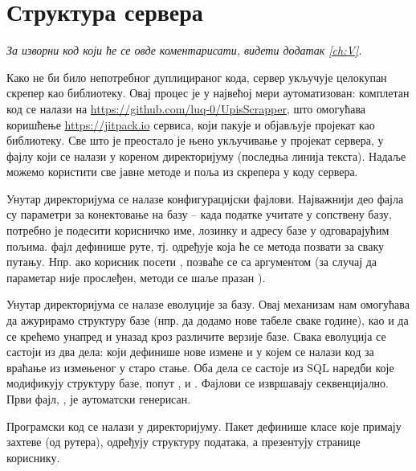 \section{Структура сервера}
\vspace*{-7mm}
\emph{За изворни код који ће се овде коментарисати, видети додатак \ref{ch:V}.}

Како не би било непотребног дуплицираног кода, сервер укључује целокупан скрепер као библиотеку. Овај процес је у највећој мери аутоматизован: комплетан код се налази на \url{https://github.com/luq-0/UpisScrapper}, што омогућава коришћење \url{https://jitpack.io} сервиса, који пакује и објављује пројекат као библиотеку. Све што је преостало је њено укључивање у пројекат сервера, у фајлу  који се налази у кореном директоријуму (последња линија текста). Надаље можемо користити све јавне методе и поља из скрепера у коду сервера.

Унутар  директоријума се налазе конфигурацијски фајлови. Најважнији део  фајла су параметри за конектовање на базу -- када податке учитате у сопствену базу, потребно је подесити корисничко име, лозинку и адресу базе у одговарајућим  пољима.  фајл дефинише руте, тј. одређује која ће се метода позвати за сваку путању. Нпр. ако корисник посети , позваће се  са аргументом  (за случај да  параметар није прослеђен, методи се шаље празан ).

Унутар  директоријума се налазе еволуције за  базу. Овај механизам нам омогућава да ажурирамо структуру базе (нпр. да додамо нове табеле сваке године), као и да се крећемо унапред и уназад кроз различите верзије базе. Свака еволуција се састоји из два дела:  који дефинише нове измене и  у којем се налази код за враћање из измењеног у старо стање. Оба дела се састоје из SQL наредби које модификују структуру базе, попут ,  и . Фајлови се извршавају секвенцијално. Први фајл, , је аутоматски генерисан.

Програмски код се налази у  директоријуму. Пакет  дефинише класе које примају захтеве (од рутера),  одређују структуру података, а  презентују странице кориснику.



